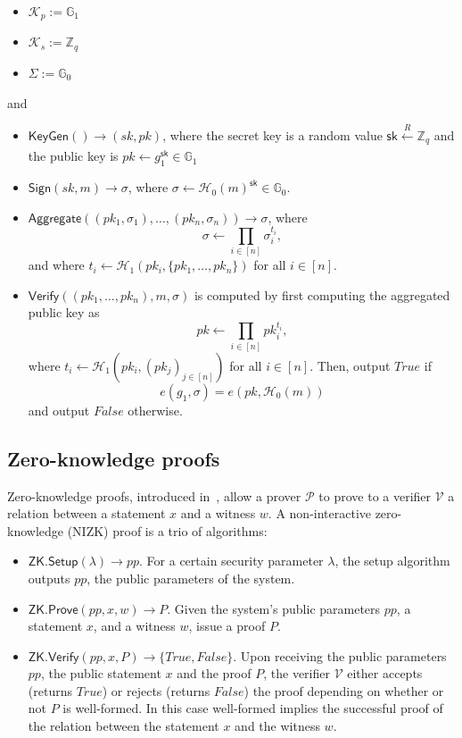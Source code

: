 \documentclass[runningheads]{llncs}
\newcommand{\K}{\mathcal{K}}
\begin{document}
\begin{itemize}
  \item \(\K_p := \mathbb{G}_1\)
  \item \(\K_s := \mathbb{Z}_q\)
  \item \(\Sigma := \mathbb{G}_0\)
\end{itemize}

and

\begin{itemize}
    \setlength
  \itemsep{0.35em}
  \item $\mathsf{KeyGen}() \to (sk, pk)$, where the secret key is a
    random value $\mathsf{sk} \xleftarrow[]{R}\mathbb{Z}_{q}$ and the
    public key is $pk \leftarrow g_{1}^{\mathsf{sk}} \in \mathbb{G}_{1}$
  \item $\mathsf{Sign}(sk, m) \to \sigma$, where $\sigma \leftarrow
    \mathcal{H}_{0}(m)^{\mathsf{sk}} \in \mathbb{G}_{0}$.
  \item \(\mathsf{Aggregate}((pk_1,\sigma_1),\dots,(pk_n,\sigma_n))
    \to \sigma\), where \[\sigma \leftarrow \prod_{i \in [n]}
    \sigma_i^{t_i},\] and where \(t_i \leftarrow \mathcal{H}_1(pk_i,
    \{pk_1, \dots, pk_n\})\) for all \(i \in [n]\).
  \item $\mathsf{Verify}((pk_1, \dots, pk_n), m, \sigma)$ is computed
    by first computing the aggregated public key as \[pk \leftarrow
    \prod_{i \in [n]} pk_i^{t_i},\] where \(t_i \leftarrow
    \mathcal{H}_1(pk_i, (pk_j)_{j \in [n]})\) for all \(i \in [n]\).
    Then, output \(True\) if \[e(g_1, \sigma) = e(pk,
    \mathcal{H}_0(m))\] and output \(False\) otherwise.
\end{itemize}

\subsection{Zero-knowledge proofs}

Zero-knowledge proofs, introduced in~\cite{zkp}, allow a prover
$\mathcal{P}$ to prove to a verifier $\mathcal{V}$ a relation between
a statement $x$ and a witness $w$. A non-interactive zero-knowledge
(NIZK) proof is a trio of algorithms:

\begin{itemize}
    \setlength
  \itemsep{0.35em}

  \item $\mathsf{ZK.Setup}(\lambda) \rightarrow pp$. For a certain
    security parameter $\lambda$, the setup algorithm outputs $pp$,
    the public parameters of the system.
  \item $\mathsf{ZK.Prove}(pp, x, w) \rightarrow P$. Given the
    system's public parameters $pp$, a statement $x$, and a witness
    $w$, issue a proof $P$.
  \item $\mathsf{ZK.Verify}(pp, x, P) \rightarrow \{True,False\}$.
    Upon receiving the public parameters $pp$, the public statement
    $x$ and the proof $P$, the verifier $\mathcal{V}$ either accepts
    (returns \(True\)) or rejects (returns \(False\)) the proof
    depending on whether or not $P$ is well-formed. In this case
    well-formed implies the successful proof of the relation between
    the statement $x$ and the witness $w$.
\end{itemize}
\end{document}

